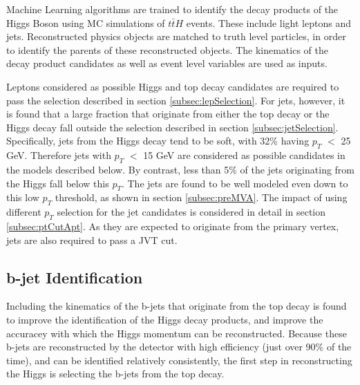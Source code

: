 Machine Learning algorithms are trained to identify the decay products of the Higgs Boson using MC simulations of $t\bar{t}H$ events. These include light leptons and jets. Reconstructed physics objects are matched to truth level particles, in order to identify the parents of these reconstructed objects. The kinematics of the decay product candidates as well as event level variables are used as inputs. 


Leptons considered as possible Higgs and top decay candidates are required to pass the selection described in section \ref{subsec:lepSelection}. For jets, however, it is found that a large fraction that originate from either the top decay or the Higgs decay fall outside the selection described in section \ref{subsec:jetSelection}. Specifically, jets from the Higgs decay tend to be soft, with 32\% having $p_T$ $<$ 25 GeV. Therefore jets with $p_T$ $<$ 15 GeV are considered as possible candidates in the models described below. By contrast, less than 5\% of the jets originating from the Higgs fall below this $p_T$. The jets are found to be well modeled even down to this low $p_T$ threshold, as shown in section \ref{subsec:preMVA}. The impact of using different $p_T$ selection for the jet candidates is considered in detail in section \ref{subsec:ptCutApt}. As they are expected to originate from the primary vertex, jets are also required to pass a JVT cut.

\subsection{b-jet Identification}
\label{sec:bjetID}

Including the kinematics of the b-jets that originate from the top decay is found to improve the identification of the Higgs decay products, and improve the accuracey with which the Higgs momentum can be reconstructed. Because these b-jets are reconstructed by the detector with high efficiency (just over 90\% of the time), and can be identified relatively consistently, the first step in reconstructing the Higgs is selecting the b-jets from the top decay.

